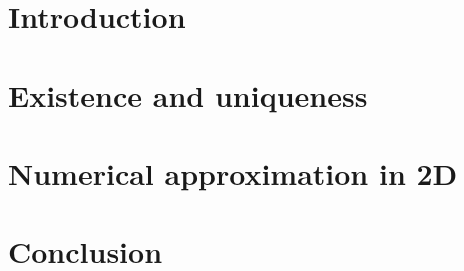 \documentclass[12pt,a4paper]{report}
\numberwithin{equation}{section}
\numberwithin{figure}{section}
\numberwithin{lemma}{section}
\theoremstyle{definition}
\begin{document}
\tableofcontents
\chapter{Introduction}\label{chap:introduction}

\chapter{Existence and uniqueness}\label{chap:existence_and_uniqueness}

\chapter{Numerical approximation in 2D}\label{chap:approximation_in_2D}

\chapter{Conclusion}\label{chap:conclusion}

\printbibliography
\end{document}
